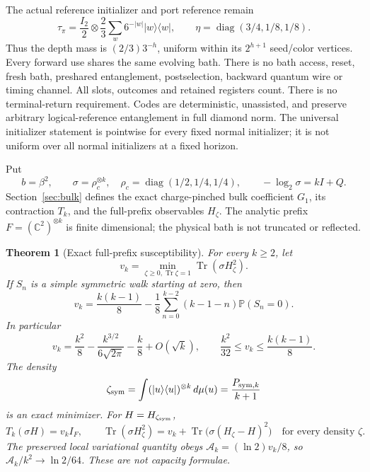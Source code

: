 \documentclass[11pt]{article}
\newtheorem{theorem}{Theorem}[section]
\newcommand{\Tr}{\operatorname{Tr}}
\newcommand{\ket}[1]{\lvert #1\rangle}
\newcommand{\bra}[1]{\langle #1\rvert}
\newcommand{\Prob}{\mathbb P}
\begin{document}
The actual reference initializer and port reference remain
\[
 \tau_\pi=\frac{I_2}{2}\otimes\frac23\sum_w6^{-|w|}\ket w\bra w,
 \qquad\eta=\operatorname{diag}(3/4,1/8,1/8).
\]
Thus the depth mass is $(2/3)3^{-h}$, uniform within its
$2^{h+1}$ seed/color vertices. Every forward use shares the same evolving
bath. There is no bath access, reset, fresh bath, preshared entanglement,
postselection, backward quantum wire or timing channel. All slots,
outcomes and retained registers count. There is no terminal-return
requirement. Codes are deterministic, unassisted, and preserve arbitrary
logical-reference entanglement in full diamond norm. The universal
initializer statement is pointwise for every fixed normal initializer;
it is not uniform over all normal initializers at a fixed horizon.

Put
\[
 b=\beta^2,\qquad \sigma=\rho_c^{\otimes k},\quad
 \rho_c=\operatorname{diag}(1/2,1/4,1/4),\qquad
 -\log_2\sigma=kI+Q.
\]
Section~\ref{sec:bulk} defines the exact charge-pinched bulk coefficient
$G_1$, its contraction $T_k$, and the full-prefix observables $H_\zeta$.
The analytic prefix $F=(\mathbb C^2)^{\otimes k}$ is finite dimensional;
the physical bath is not truncated or reflected.

\begin{theorem}[Exact full-prefix susceptibility]\label{thm:sharp}
For every $k\ge2$, let
\[
 v_k=\min_{\zeta\ge0,\Tr\zeta=1}\Tr(\sigma H_\zeta^2).
\]
If $S_n$ is a simple symmetric walk starting at zero, then
\begin{equation}\label{eq:exactv}
 v_k=\frac{k(k-1)}8-\frac18\sum_{n=0}^{k-2}(k-1-n)\Prob(S_n=0).
\end{equation}
In particular
\begin{equation}\label{eq:vasympt}
 v_k=\frac{k^2}8-\frac{k^{3/2}}{6\sqrt{2\pi}}-\frac{k}8
       +O(\sqrt k),\qquad
 \frac{k^2}{32}\le v_k\le\frac{k(k-1)}8.
\end{equation}
The density
\[
 \zeta_{\rm sym}=\int(\ket u\bra u)^{\otimes k}\,d\mu(u)
               =\frac{P_{{\rm sym},k}}{k+1}
\]
is an exact minimizer. For $H=H_{\zeta_{\rm sym}}$,
\begin{equation}\label{eq:scalar}
 T_k(\sigma H)=v_k I_F,\qquad
 \Tr(\sigma H_\zeta^2)=v_k+\Tr\bigl(\sigma(H_\zeta-H)^2\bigr)
 \quad\text{for every density }\zeta.
\end{equation}
The preserved local variational quantity obeys
$\mathcal A_k=(\ln2)v_k/8$, so
$\mathcal A_k/k^2\to\ln2/64$. These are not capacity formulae.
\end{theorem}
\end{document}
